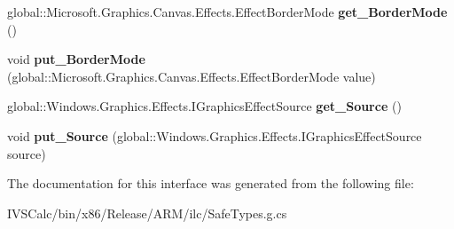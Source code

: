 \begin{DoxyCompactItemize}
\item 
\mbox{\label{interface_microsoft_1_1_graphics_1_1_canvas_1_1_effects_1_1_i_directional_blur_effect_a74efbf96cb636f056a89880c63859cd8}} 
global\+::\+Microsoft.\+Graphics.\+Canvas.\+Effects.\+Effect\+Border\+Mode {\bfseries get\+\_\+\+Border\+Mode} ()
\item 
\mbox{\label{interface_microsoft_1_1_graphics_1_1_canvas_1_1_effects_1_1_i_directional_blur_effect_a826a5452cf6d53f023b716ce8307b270}} 
void {\bfseries put\+\_\+\+Border\+Mode} (global\+::\+Microsoft.\+Graphics.\+Canvas.\+Effects.\+Effect\+Border\+Mode value)
\item 
\mbox{\label{interface_microsoft_1_1_graphics_1_1_canvas_1_1_effects_1_1_i_directional_blur_effect_a4bd130580cbba798a3932118c6be8047}} 
global\+::\+Windows.\+Graphics.\+Effects.\+I\+Graphics\+Effect\+Source {\bfseries get\+\_\+\+Source} ()
\item 
\mbox{\label{interface_microsoft_1_1_graphics_1_1_canvas_1_1_effects_1_1_i_directional_blur_effect_a2ac36071af70289687b3c9a8a77dcf46}} 
void {\bfseries put\+\_\+\+Source} (global\+::\+Windows.\+Graphics.\+Effects.\+I\+Graphics\+Effect\+Source source)
\end{DoxyCompactItemize}


The documentation for this interface was generated from the following file\+:\begin{DoxyCompactItemize}
\item 
I\+V\+S\+Calc/bin/x86/\+Release/\+A\+R\+M/ilc/Safe\+Types.\+g.\+cs\end{DoxyCompactItemize}
